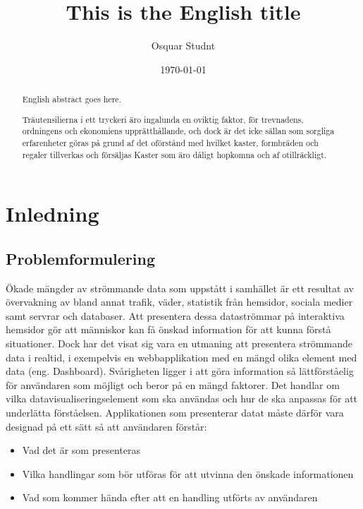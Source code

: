 \documentclass{kththesis}
\title{This is the English title}
\author{Osquar Studnt}
\date{\today}
\begin{document}
\frontmatter

\titlepage

\begin{abstract}
  English abstract goes here.

  \blindtext
\end{abstract}


\begin{otherlanguage}{swedish}
  \begin{abstract}
    Träutensilierna i ett tryckeri äro ingalunda en oviktig faktor,
    för trevnadens, ordningens och ekonomiens upprätthållande, och
    dock är det icke sällan som sorgliga erfarenheter göras på grund
    af det oförstånd med hvilket kaster, formbräden och regaler
    tillverkas och försäljas Kaster som äro dåligt hopkomna och af
    otillräckligt.
  \end{abstract}
\end{otherlanguage}


\tableofcontents


\mainmatter


\chapter{Inledning}


\section{Problemformulering}

Ökade mängder av strömmande data som uppstått i samhället är ett resultat av övervakning av bland annat trafik, väder, statistik från hemsidor, sociala medier samt servrar och databaser. Att presentera dessa dataströmmar på interaktiva hemsidor gör att människor kan få önskad information för att kunna förstå situationer. Dock har det visat sig vara en utmaning att presentera strömmande data i realtid, i exempelvis en webbapplikation med en mängd olika element med data (eng. Dashboard). Svårigheten ligger i att göra information så lättförståelig för användaren som möjligt och beror på en mängd faktorer. Det handlar om vilka datavisualiseringselement som ska användas och hur de ska anpassas för att underlätta förståelsen. Applikationen som presenterar datat måste därför vara designad på ett sätt så att användaren förstår: 


\begin{itemize}
\item Vad det är som presenteras
\item Vilka handlingar som bör utföras för att 	   utvinna den önskade informationen
\item Vad som kommer hända efter att en handling 		utförts av användaren
\end{itemize}
\end{document}
